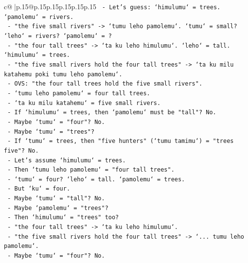 \documentclass{article}
\begin{document}
{\begin{supertabular}{c@{$\;$}|p{.15\linewidth}@{}p{.15\linewidth}p{.15\linewidth}p{.15\linewidth}p{.15\linewidth}p{.15\linewidth}}
{{{\texttt{                  {-} Let's guess: `himulumu` = trees. `pamolemu` = rivers.} \\
\texttt{                  {-} "the five small rivers" {-}> `tumu leho pamolemu`. `tumu` = small? `leho` = rivers? `pamolemu` = ?} \\
\texttt{                  {-} "the four tall trees" {-}> `ta ku leho himulumu`. `leho` = tall. `himulumu` = trees.} \\
\texttt{                  {-} "the five small rivers hold the four tall trees" {-}> `ta ku milu katahemu poki tumu leho pamolemu`.} \\
\texttt{                    {-} OVS: "the four tall trees hold the five small rivers".} \\
\texttt{                    {-} `tumu leho pamolemu` = four tall trees.} \\
\texttt{                    {-} `ta ku milu katahemu` = five small rivers.} \\
\texttt{                    {-} If `himulumu` = trees, then `pamolemu` must be "tall"? No.} \\
\texttt{                    {-} Maybe `tumu` = "four"? No.} \\
\texttt{                    {-} Maybe `tumu` = "trees"?} \\
\texttt{                    {-} If `tumu` = trees, then "five hunters" (`tumu tamimu`) = "trees five"? No.} \\
\texttt{                    {-} Let's assume `himulumu` = trees.} \\
\texttt{                    {-} Then `tumu leho pamolemu` = "four tall trees".} \\
\texttt{                    {-} `tumu` = four? `leho` = tall. `pamolemu` = trees.} \\
\texttt{                    {-} But `ku` = four.} \\
\texttt{                    {-} Maybe `tumu` = "tall"? No.} \\
\texttt{                    {-} Maybe `pamolemu` = "trees"?} \\
\texttt{                    {-} Then `himulumu` = "trees" too?} \\
\texttt{                    {-} "the four tall trees" {-}> `ta ku leho himulumu`.} \\
\texttt{                    {-} "the five small rivers hold the four tall trees" {-}> `... tumu leho pamolemu`.} \\
\texttt{                    {-} Maybe `tumu` = "four"? No.} \\
}}}
\end{supertabular}}
\end{document}
